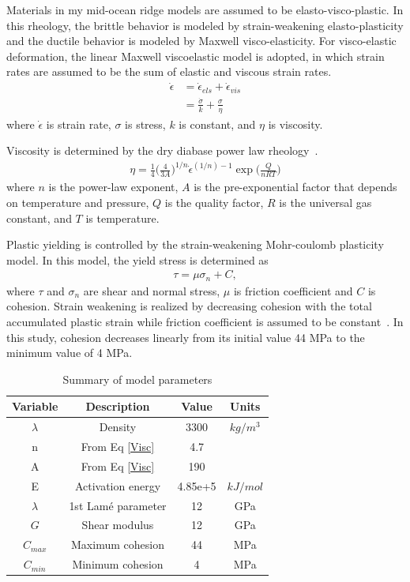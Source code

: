 \documentclass[letterpaper,12pt,notitle]{memphisthesis}                     %
\begin{document}
Materials in my mid-ocean ridge models are assumed to be elasto-visco-plastic. In this rheology, the brittle behavior is modeled by strain-weakening elasto-plasticity and the ductile behavior is modeled by Maxwell visco-elasticity. 
For visco-elastic deformation, the linear Maxwell viscoelastic model is adopted, in which strain rates are assumed to be the sum of elastic and viscous strain rates.
\begin{align} \label{srate}
  \dot{\epsilon} &=  {\dot{\epsilon}}_{els} +  {\dot{\epsilon}}_{vis} \\
                        &= \frac{ \dot{\sigma}}{k} + \frac{\sigma}{\eta}
\end{align}
where $\dot{\epsilon}$ is strain rate, $\sigma$ is stress, $k$ is constant, and $\eta$ is viscosity.
%

Viscosity is determined by the dry diabase power law rheology~\citep{Kirby1987, Chen1990}.
\begin{align} \label{Visc}
 \eta = \frac{1}{4} \bigg( \frac{4}{3A} \bigg)^{1/n} \dot{\epsilon}^{(1/n)-1} \exp\bigg(\frac{Q}{nRT}\bigg)
\end{align}
where $n$ is the power-law exponent, $A$ is the pre-exponential factor that depends on temperature and pressure, $Q$ is the quality factor, $R$ is the universal gas constant, and $T$ is temperature.
%

Plastic yielding is controlled by the strain-weakening Mohr-coulomb plasticity model. In this model, the yield stress is determined as
\begin{align}
 \tau = \mu \sigma_n + C,
\end{align}
where $\tau$ and $\sigma_{n}$ are shear and normal stress, $\mu$ is friction coefficient and $C$ is cohesion.
%
Strain weakening is realized by decreasing cohesion with the total accumulated plastic strain while friction coefficient is assumed to be constant~\citep{Poliakov1998}. In this study, cohesion decreases linearly from its initial value 44 MPa to the minimum value of 4 MPa.
%
\begin{table}[h!]
	\centering
	\caption{Summary of model parameters}
	\label{tab:modelparams}
	\begin{tabular}{cccc}
		\toprule
		Variable & Description & Value & Units\\
		\midrule
          	$\lambda$ & Density & 3300 & $kg/m^3$\\
	        n & From Eq \ref{Visc} & 4.7 & \\
	        A & From Eq \ref{Visc} & 190 & \\
	        E & Activation energy & 4.85e+5 & $kJ/mol$ \\
	        $\lambda$ & 1st Lam\'e parameter & 12 & GPa\\
	        $G$ & Shear modulus & 12 & GPa\\
	        $C_{max}$ & Maximum cohesion & 44 & MPa\\
	        $C_{min}$ & Minimum cohesion & 4 & MPa\\
		\bottomrule
	\end{tabular}
\end{table}
%
\end{document}

